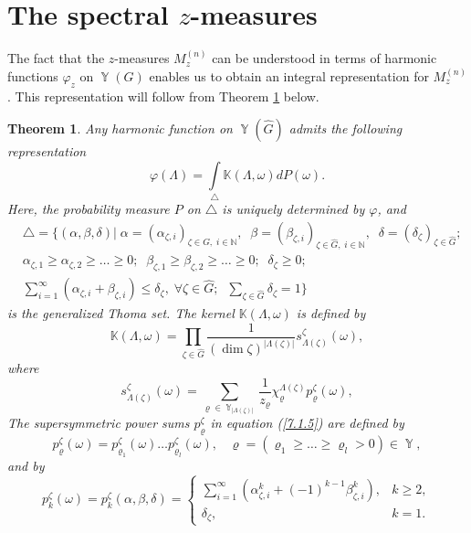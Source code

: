 \documentclass[12pt]{amsart}
\newtheorem{thm}{Theorem}[section]
\theoremstyle{definition}
\numberwithin{equation}{section}
\DeclareMathOperator{\Y}{\mathbb{Y}}
\begin{document}
\section{The spectral $z$-measures}\label{SECTIONSPECTRAL}
The fact that the $z$-measures $M_z^{(n)}$ can be understood in terms of
harmonic functions $\varphi_z$ on $\Y(G)$ enables us to obtain an integral representation
for $M_z^{(n)}$. This representation will follow from Theorem \ref{THEOREM7.1.1} below.
\begin{thm}\label{THEOREM7.1.1}
Any harmonic function on $\Y(\widehat{G})$ admits the following representation
\begin{equation}\label{7.1.2}
\varphi(\Lambda)=\int\limits_{\triangle}\mathbb{K}(\Lambda,\omega)dP(\omega).
\end{equation}
Here,
the probability measure $P$ on $\triangle$ is uniquely determined by $\varphi$,
and
\begin{equation}\label{7.1.3}
\begin{split}
&\triangle=\biggl\{(\alpha,\beta,\delta)|\;
\alpha=\left(\alpha_{\zeta,i}\right)_{\zeta\in\widehat{G},\; i\in\mathbb{N}},\;\;
\beta=\left(\beta_{\zeta,i}\right)_{\zeta\in\widehat{G},\; i\in\mathbb{N}},\;\;
\delta=(\delta_{\zeta})_{\zeta\in\widehat{G}};\\
&\alpha_{\zeta,1}\geq\alpha_{\zeta,2}\geq \ldots\geq 0;\;\;
\beta_{\zeta,1}\geq\beta_{\zeta,2}\geq\ldots\geq 0;\;\;\delta_{\zeta}\geq 0;\\
&\sum\limits_{i=1}^{\infty}\left(\alpha_{\zeta,i}+\beta_{\zeta,i}\right)\leq\delta_{\zeta},\;
\forall\zeta\in\widehat{G};\;\;\sum\limits_{\zeta\in\widehat{G}}\delta_{\zeta}=1\biggr\}
\end{split}
\end{equation}
is the generalized Thoma set. The kernel $\mathbb{K}(\Lambda,\omega)$ is defined by
\begin{equation}\label{7.1.4}
\mathbb{K}(\Lambda,\omega)=\prod\limits_{\zeta\in\widehat{G}}
\frac{1}{(\dim\zeta)^{|\Lambda(\zeta)|}}s^{\zeta}_{\Lambda(\zeta)}(\omega),
\end{equation}
 where
\begin{equation}\label{7.1.5}
s^{\zeta}_{\Lambda(\zeta)}(\omega)=\sum\limits_{\varrho\in\Y_{\left|\Lambda(\zeta)\right|}}
\frac{1}{z_{\varrho}}\chi^{\Lambda(\zeta)}_{\varrho}p_{\varrho}^{\zeta}(\omega),
\end{equation}
The supersymmetric power sums $p_{\varrho}^{\zeta}$ in equation (\ref{7.1.5}) are defined by
\begin{equation}\label{7.1.6}
p_{\varrho}^{\zeta}(\omega)=p_{\varrho_1}^{\zeta}(\omega)\ldots p_{\varrho_l}^{\zeta}(\omega),
\;\;\;
\varrho=\left(\varrho_1\geq\ldots\geq\varrho_l>0\right)\in\Y,
\end{equation}
and by
\begin{equation}\label{7.1.7}
p_k^{\zeta}(\omega)=p_k^{\zeta}(\alpha,\beta,\delta)
=\left\{
  \begin{array}{ll}
    \sum\limits_{i=1}^{\infty}\left(\alpha_{\zeta,i}^k+(-1)^{k-1}\beta_{\zeta,i}^k\right), & k\geq 2, \\
    \delta_{\zeta}, &  k=1.
  \end{array}
\right.
\end{equation}
\end{thm}
\end{document}
